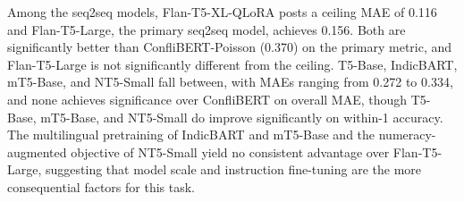 \documentclass[
  11pt,
]{article}
\begin{document}
\begin{table}

\caption{\label{tbl-llm-baseline}Death count extraction performance:
large language models.}


\end{table}%

Among the seq2seq models, Flan-T5-XL-QLoRA posts a ceiling MAE of 0.116
and Flan-T5-Large, the primary seq2seq model, achieves 0.156. Both are
significantly better than ConfliBERT-Poisson (0.370) on the primary
metric, and Flan-T5-Large is not significantly different from the
ceiling. T5-Base, IndicBART, mT5-Base, and NT5-Small fall between, with
MAEs ranging from 0.272 to 0.334, and none achieves significance over
ConfliBERT on overall MAE, though T5-Base, mT5-Base, and NT5-Small do
improve significantly on within-1 accuracy. The multilingual pretraining
of IndicBART and mT5-Base and the numeracy-augmented objective of
NT5-Small yield no consistent advantage over Flan-T5-Large, suggesting
that model scale and instruction fine-tuning are the more consequential
factors for this task.
\end{document}

